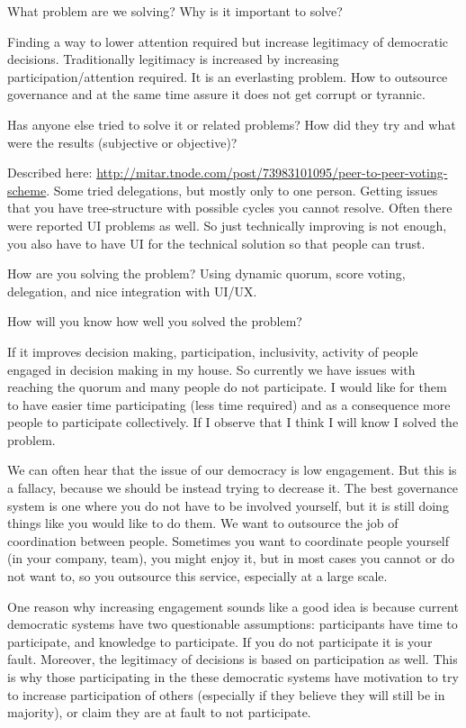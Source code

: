 \documentclass{sigchi}
\begin{document}
What problem are we solving? Why is it important to solve?

Finding a way to lower attention required but increase legitimacy of democratic decisions.
Traditionally legitimacy is increased by increasing participation/attention required.
It is an everlasting problem.
How to outsource governance and at the same time assure it does not get corrupt
or tyrannic.

Has anyone else tried to solve it or related problems? How did they try
and what were the results (subjective or objective)?

Described here: \url{http://mitar.tnode.com/post/73983101095/peer-to-peer-voting-scheme}.
Some tried delegations, but mostly only to one person.
Getting issues that you have tree-structure with possible cycles you cannot resolve.
Often there were reported UI problems as well.
So just technically improving is not enough, you also have to have UI for the technical solution so that people can trust.

How are you solving the problem?
Using dynamic quorum, score voting, delegation, and nice integration with UI/UX.

How will you know how well you solved the problem?

If it improves decision making, participation, inclusivity, activity of people engaged in decision making in my house.
So currently we have issues with reaching the quorum and many people do not participate.
I would like for them to have easier time participating (less time required) and as a consequence more people to
participate collectively.
If I observe that I think I will know I solved the problem.


We can often hear that the issue of our democracy is low engagement.
But this is a fallacy, because we should be instead trying to decrease it.
The best governance system is one where you do not have to be involved yourself, but it is still doing things
like you would like to do them.
We want to outsource the job of coordination between people.
Sometimes you want to coordinate people yourself (in your company, team), you might enjoy it, but in most cases
you cannot or do not want to, so you outsource this service, especially at a large scale.

One reason why increasing engagement sounds like a good idea is because current democratic systems have two
questionable assumptions: participants have time to participate, and knowledge to participate.
If you do not participate it is your fault.
Moreover, the legitimacy of decisions is based on participation as well.
This is why those participating in the these democratic systems have motivation to try to increase participation
of others (especially if they believe they will still be in majority), or claim they are at fault to not participate.
\end{document}
